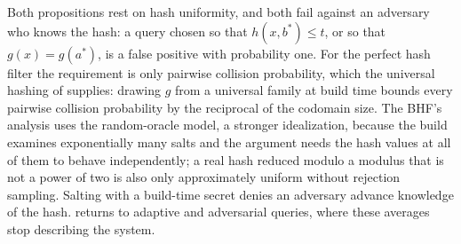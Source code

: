 Both propositions rest on hash uniformity, and both fail against an
adversary who knows the hash: a query chosen so that $h(x, b^{*}) \le t$,
or so that $g(x) = g(a^{*})$, is a false positive with probability one.
For the perfect hash filter the requirement is only pairwise collision
probability, which the universal hashing of
\textcite{carter-wegman-1979} supplies: drawing $g$ from a universal
family at build time bounds every pairwise collision probability by the
reciprocal of the codomain size. The BHF's analysis uses the
random-oracle model, a stronger idealization, because the build examines
exponentially many salts and the argument needs the hash values at all of
them to behave independently; a real hash reduced modulo a modulus that
is not a power of two is also only approximately uniform without
rejection sampling. Salting with a build-time secret denies an adversary
advance knowledge of the hash.  returns to
adaptive and adversarial queries, where these averages stop describing
the system.
